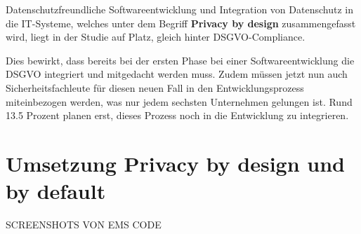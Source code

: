 Datenschutzfreundliche Softwareentwicklung und Integration von Datenschutz in die IT-Systeme, welches unter dem Begriff \textbf{Privacy by design} zusammengefasst wird, liegt in der Studie auf Platz, gleich hinter DSGVO-Compliance. 

Dies bewirkt, dass bereits bei der ersten Phase bei einer Softwareentwicklung die DSGVO integriert und mitgedacht werden muss. Zudem müssen jetzt nun auch Sicherheitsfachleute für diesen neuen Fall in den Entwicklungsprozess miteinbezogen werden, was nur jedem sechsten Unternehmen gelungen ist. Rund 13.5 Prozent planen erst, dieses Prozess noch in die Entwicklung zu integrieren.

\section{Umsetzung Privacy by design und by default}

SCREENSHOTS VON EMS CODE
 
\newpage
